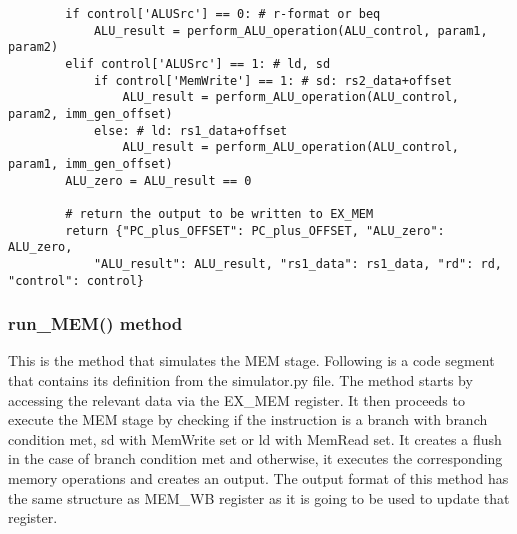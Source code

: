 \begin{lstlisting}
        if control['ALUSrc'] == 0: # r-format or beq
            ALU_result = perform_ALU_operation(ALU_control, param1, param2)
        elif control['ALUSrc'] == 1: # ld, sd
            if control['MemWrite'] == 1: # sd: rs2_data+offset
                ALU_result = perform_ALU_operation(ALU_control, param2, imm_gen_offset)
            else: # ld: rs1_data+offset
                ALU_result = perform_ALU_operation(ALU_control, param1, imm_gen_offset)
        ALU_zero = ALU_result == 0

        # return the output to be written to EX_MEM
        return {"PC_plus_OFFSET": PC_plus_OFFSET, "ALU_zero": ALU_zero, 
            "ALU_result": ALU_result, "rs1_data": rs1_data, "rd": rd, "control": control}
\end{lstlisting}

\subsubsection{run\_MEM() method}
This is the method that simulates the MEM stage. Following is a code segment that contains its definition from the simulator.py file. The method starts by accessing the relevant data via the EX\_MEM register. It then proceeds to execute the MEM stage by checking if the instruction is a branch with branch condition met, sd with MemWrite set or ld with MemRead set. It creates a flush in the case of branch condition met and otherwise, it executes the corresponding memory operations and creates an output. The output format of this method has the same structure as MEM\_WB register as it is going to be used to update that register.
\vspace{0.5 cm}

